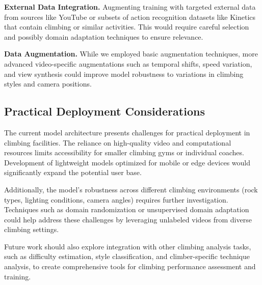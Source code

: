 \noindent\textbf{External Data Integration.}
Augmenting training with targeted external data from sources like YouTube or subsets of action recognition datasets like Kinetics that contain climbing or similar activities. This would require careful selection and possibly domain adaptation techniques to ensure relevance.

\noindent\textbf{Data Augmentation.}
While we employed basic augmentation techniques, more advanced video-specific augmentations such as temporal shifts, speed variation, and view synthesis could improve model robustness to variations in climbing styles and camera positions.

\subsection*{Practical Deployment Considerations}
The current model architecture presents challenges for practical deployment in climbing facilities. The reliance on high-quality video and computational resources limits accessibility for smaller climbing gyms or individual coaches. Development of lightweight models optimized for mobile or edge devices would significantly expand the potential user base.

Additionally, the model's robustness across different climbing environments (rock types, lighting conditions, camera angles) requires further investigation. Techniques such as domain randomization or unsupervised domain adaptation could help address these challenges by leveraging unlabeled videos from diverse climbing settings.

Future work should also explore integration with other climbing analysis tasks, such as difficulty estimation, style classification, and climber-specific technique analysis, to create comprehensive tools for climbing performance assessment and training.

